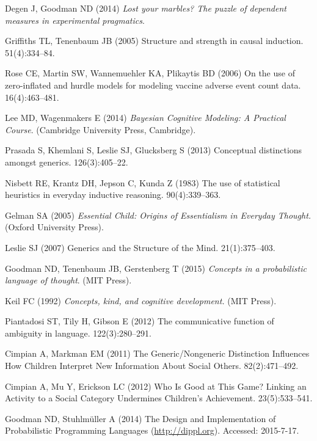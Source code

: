 \documentclass{pnastwo}
\begin{document}
\begin{article}
\begin{thebibliography}{10}
Degen J, Goodman ND (2014) {\em Lost your marbles? The puzzle of dependent
  measures in experimental pragmatics}.

Griffiths TL, Tenenbaum JB (2005) {Structure and strength in causal induction.}
 51(4):334--84.

Rose CE, Martin SW, Wannemuehler KA, Plikaytis BD (2006) On the use of
  zero-inflated and hurdle models for modeling vaccine adverse event count
  data.
 16(4):463--481.

Lee MD, Wagenmakers E (2014) {\em Bayesian Cognitive Modeling: A Practical
  Course}.
\newblock (Cambridge University Press, Cambridge).

Prasada S, Khemlani S, Leslie SJ, Glucksberg S (2013) {Conceptual distinctions
  amongst generics.}
 126(3):405--22.

Nisbett RE, Krantz DH, Jepson C, Kunda Z (1983) {The use of statistical
  heuristics in everyday inductive reasoning.}
 90(4):339--363.

Gelman SA (2005) {\em Essential Child: Origins of Essentialism in Everyday
  Thought.}
\newblock (Oxford University Press).

Leslie SJ (2007) {Generics and the Structure of the Mind}.
 21(1):375--403.

Goodman ND, Tenenbaum JB, Gerstenberg T (2015) {\em Concepts in a probabilistic
  language of thought}.
\newblock (MIT Press).

Keil FC (1992) {\em Concepts, kind, and cognitive development.}
\newblock (MIT Press).

Piantadosi ST, Tily H, Gibson E (2012) {The communicative function of ambiguity
  in language}.
 122(3):280--291.

Cimpian A, Markman EM (2011) {The Generic/Nongeneric Distinction Influences How
  Children Interpret New Information About Social Others}.
 82(2):471--492.

Cimpian A, Mu Y, Erickson LC (2012) {Who Is Good at This Game? Linking an
  Activity to a Social Category Undermines Children's Achievement}.
 23(5):533--541.

Goodman ND, Stuhlm\"{u}ller A (2014) {The Design and Implementation of
  Probabilistic Programming Languages} (\url{http://dippl.org}).
\newblock Accessed: 2015-7-17.

\end{thebibliography}



\end{article}
\end{document}
